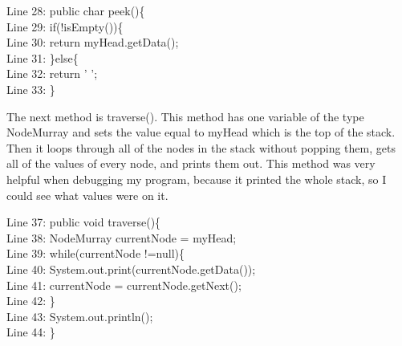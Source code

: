 \documentclass{article}
\begin{document}
\vspace{2em}
Line 28: public char peek()\{\\
    \hspace*{1.5em}Line 29:\hspace*{1em} if(!isEmpty())\{\\
    \hspace*{1.5em}Line 30: \hspace*{2em}return myHead.getData();\\
    \hspace*{1.5em}Line 31: \hspace*{1em}\}else\{\\
    \hspace*{1.5em}Line 32: \hspace*{2em} return ' ';\\
    \hspace*{1.5em}Line 33: \}\\
\vspace{2em}

\noindent
The next method is traverse(). This method has one variable of the type NodeMurray and sets the value equal to myHead which is the top of the stack. Then it loops through all of the nodes in the stack without popping them, gets all of the values of every node, and prints them out. This method was very helpful when debugging my program, because it printed the whole stack, so I could see what values were on it. 

\vspace{2em}
Line 37: public void traverse()\{\\
    \hspace*{1.5em}Line 38:\hspace*{1em} NodeMurray currentNode = myHead;\\
    \hspace*{1.5em}Line 39: \hspace*{1em}while(currentNode !=null)\{\\
    \hspace*{1.5em}Line 40:  \hspace*{2em}System.out.print(currentNode.getData());\\
    \hspace*{1.5em}Line 41:\hspace*{2em} currentNode = currentNode.getNext();\\
    \hspace*{1.5em}Line 42:\hspace*{1em} \}\\
    \hspace*{1.5em}Line 43: \hspace*{1em}System.out.println();\\
    \hspace*{1.5em}Line 44: \}\\
\vspace{2em}
\end{document}
